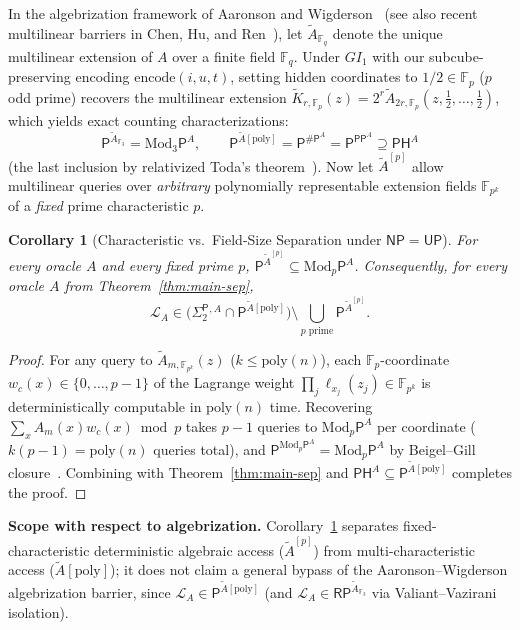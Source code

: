 \documentclass[11pt,a4paper]{article}
\newtheorem{corollary}[theorem]{Corollary}
\theoremstyle{definition}
\theoremstyle{remark}
\newcommand{\Pcl}{\mathsf{P}}
\newcommand{\NP}{\mathsf{NP}}
\newcommand{\UP}{\mathsf{UP}}
\newcommand{\PP}{\mathsf{PP}}
\newcommand{\PH}{\mathsf{PH}}
\newcommand{\Modp}{\mathrm{Mod}_p\mathsf{P}}
\newcommand{\Modthree}{\mathrm{Mod}_3\mathsf{P}}
\newcommand{\SharpP}{\#\mathsf{P}}
\newcommand{\SigTwo}{\Sigma_2^{\mathsf{P}}}
\newcommand{\F}{\mathbb{F}}
\newcommand{\GI}{GI_1}
\begin{document}
In the algebrization framework of Aaronson and Wigderson~\cite{AaronsonWigderson2009} (see also recent multilinear barriers in Chen, Hu, and Ren~\cite{ChenHuRen2026}), let $\widetilde{A}_{\F_q}$ denote the unique multilinear extension of $A$ over a finite field $\F_q$. Under $\GI$ with our subcube-preserving encoding $\mathrm{encode}(i, u, t)$, setting hidden coordinates to $1/2 \in \F_p$ ($p$ odd prime) recovers the multilinear extension $\widetilde{K}_{r,\F_p}(z) = 2^r \widetilde{A}_{2r,\F_p}(z, \tfrac12, \dots, \tfrac12)$, which yields exact counting characterizations:
\[
  \Pcl^{\widetilde{A}_{\F_3}} = \Modthree^A,
  \qquad
  \Pcl^{\widetilde{A}[\mathrm{poly}]} = \Pcl^{\SharpP^A} = \Pcl^{\PP^A} \supseteq \PH^A
\]
(the last inclusion by relativized Toda's theorem~\cite{Toda1991}). Now let $\widetilde{A}^{[p]}$ allow multilinear queries over \emph{arbitrary} polynomially representable extension fields $\F_{p^k}$ of a \emph{fixed} prime characteristic $p$.

\begin{corollary}[Characteristic vs.\ Field-Size Separation under $\NP = \UP$]
\label{cor:char-sep}
For every oracle $A$ and every fixed prime $p$, $\Pcl^{\widetilde{A}^{[p]}} \subseteq \Modp^A$. Consequently, for every oracle $A$ from Theorem~\ref{thm:main-sep},
\[
  \mathcal{L}_A \in \bigl(\SigTwo{}^{,A} \cap \Pcl^{\widetilde{A}[\mathrm{poly}]}\bigr)
  \setminus \bigcup_{p\text{ prime}} \Pcl^{\widetilde{A}^{[p]}}.
\]
\end{corollary}

\begin{proof}
For any query to $\widetilde{A}_{m,\F_{p^k}}(z)$ ($k \le \mathrm{poly}(n)$), each $\F_p$-coordinate $w_c(x) \in \{0,\dots,p-1\}$ of the Lagrange weight $\prod_j \ell_{x_j}(z_j) \in \F_{p^k}$ is deterministically computable in $\mathrm{poly}(n)$ time. Recovering $\sum_x A_m(x) w_c(x) \bmod p$ takes $p - 1$ queries to $\Modp^A$ per coordinate ($k(p-1) = \mathrm{poly}(n)$ queries total), and $\Pcl^{\Modp^A} = \Modp^A$ by Beigel--Gill closure~\cite{BeigelGill1992}. Combining with Theorem~\ref{thm:main-sep} and $\PH^A \subseteq \Pcl^{\widetilde{A}[\mathrm{poly}]}$ completes the proof.
\end{proof}
\textbf{Scope with respect to algebrization.} Corollary~\ref{cor:char-sep} separates fixed-characteristic deterministic algebraic access ($\widetilde{A}^{[p]}$) from multi-characteristic access ($\widetilde{A}[\mathrm{poly}]$); it does not claim a general bypass of the Aaronson--Wigderson algebrization barrier, since $\mathcal{L}_A \in \Pcl^{\widetilde{A}[\mathrm{poly}]}$ (and $\mathcal{L}_A \in \mathsf{RP}^{\widetilde{A}_{\F_3}}$ via Valiant--Vazirani isolation).
\end{document}

